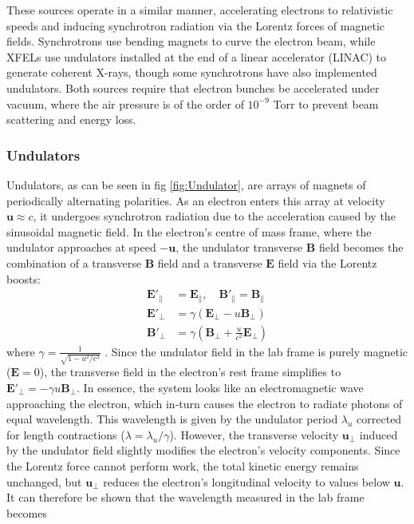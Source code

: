 \documentclass[aps,prb,twocolumn,superscriptaddress]{revtex4-2}
\begin{document}
These sources operate in a similar manner, accelerating
electrons to relativistic speeds and inducing synchrotron radiation via the
Lorentz forces of magnetic fields. Synchrotrons use bending magnets to curve the
electron beam, while XFELs use undulators installed at the end of a linear
accelerator (LINAC) to generate coherent X-rays, though 
some synchrotrons have also implemented undulators. Both sources require that 
electron bunches be accelerated under vacuum, where the air pressure is of the 
order of $10^{-9}$ Torr to prevent beam scattering and energy loss.

\subsubsection{Undulators}
Undulators, as can be seen in fig \ref{fig:Undulator}, are 
arrays of magnets of periodically alternating polarities. As an electron enters
this array at velocity $\textbf{u} \approx c$, it undergoes synchrotron 
radiation due to the acceleration caused by the sinusoidal magnetic field. In
the electron's centre of mass frame, where the undulator approaches at speed
$-\textbf{u}$, the undulator transverse $\textbf{B}$ field becomes the
combination of a transverse $\textbf{B}$ field and a transverse $\textbf{E}$
field via the Lorentz boosts:
\begin{align}
\mathbf{E}'_{\parallel} &= \mathbf{E}_{\parallel}, \quad \mathbf{B}'_{\parallel} = \mathbf{B}_{\parallel} \\
\mathbf{E}'_{\perp} &= \gamma (\mathbf{E}_{\perp} - u \mathbf{B}_{\perp}) \\
\mathbf{B}'_{\perp} &= \gamma \left( \mathbf{B}_{\perp} + \frac{u}{c^2} \mathbf{E}_{\perp} \right)
\end{align}
where $\gamma = \frac{1}{\sqrt{1 - u^2/c^2}}$ . Since the undulator field in
the lab frame is purely magnetic ($\textbf{E} = 0$), the transverse field in
the electron's rest frame simplifies to $\mathbf{E}'_{\perp} = - \gamma u
\mathbf{B}_{\perp}$. In essence, the system looks like an electromagnetic wave
approaching the electron, which in-turn causes the electron to radiate photons
of equal wavelength. This wavelength is given by the undulator period
$\lambda_u$ corrected for length contractions ($\lambda = \lambda_u/\gamma$).
However, the transverse velocity $\textbf{u}_{\perp}$ induced by the undulator
field slightly modifies the electron’s velocity components. Since the Lorentz
force cannot perform work, the total kinetic energy remains unchanged, but
$\textbf{u}_{\perp}$ reduces the electron’s longitudinal velocity to values
below $\textbf{u}$. It can therefore be shown that the wavelength measured in 
the lab frame becomes
\end{document}
